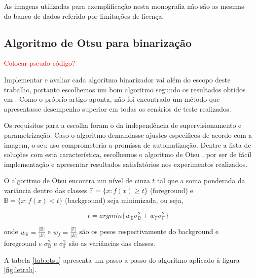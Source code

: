 \documentclass[a4paper,11pt]{article}
\newcommand{\TODO}[1]{\textcolor{red}{#1}}
\begin{document}
      As imagens utilizadas para exemplificação nesta monografia não são as mesmas do banco de dados referido por limitações de licença.

    \subsection{Algoritmo de Otsu para binarização}

      \TODO{Colocar pseudo-código?}


      Implementar e avaliar cada algoritmo binarizador vai além do escopo deste trabalho, portanto escolhemos um bom algoritmo segundo os resultados obtidos em \cite{citeulike:890354}. Como o próprio artigo aponta, não foi encontrado um método que apresentasse desempenho superior em todas os cenários de teste realizados.

      Os requisitos para a escolha foram o da independência de supervisionamento e parametrização. Caso o algoritmo demandasse ajustes específicos de acordo com a imagem, o seu uso comprometeria a promissa de automatização. Dentre a lista de soluções com esta característica, escolhemos o algoritmo de Otsu \cite{1979:ots}, por ser de fácil implementação e apresentar resultados satisfatórios nos experimentos realizados.

      O algoritmo de Otsu encontra um nível de cinza $t$ tal que a soma ponderada da variância dentro das classes $\mathbb{F} = \{ x \colon f(x) \geq t \}$ (foreground) e $\mathbb{B} = \{ x \colon f(x) < t \}$ (background) seja minimizada, ou seja,

      \begin{equation}
        t = argmin \{ w_\mathbb{B} \sigma^{2}_{\mathbb{B}} + w_\mathbb{F} \sigma^{2}_{\mathbb{F}} \}
      \end{equation}

      onde $w_\mathbb{B} = \frac{|\mathbb{B}|}{|E|}$ e $w_f = \frac{|\mathbb{F}|}{|E|}$ são os pesos respectivamente do background e foreground e $\sigma^{2}_{\mathbb{B}}$ e $\sigma^{2}_{\mathbb{F}}$ são as variâncias das classes.

      A tabela \ref{tab:otsu} apresenta um passo a passo do algoritmo aplicado à figura \ref{fig:letrah}.
\end{document}
